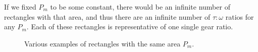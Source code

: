 \documentclass[12pt]{article}
\begin{document}
If we fixed $P_{m}$ to be some constant, there would be an infinite number of rectangles with that area, and thus there are an infinite number of $\tau:\omega$ ratios for any $P_{m}$. Each of these rectangles is representative of one single gear ratio. 

\begin{figure}[H]
  \centering
  \caption{Various examples of rectangles with the same area $P_{m}$.}\label{fig:side_rects}
\end{figure}
\end{document}
